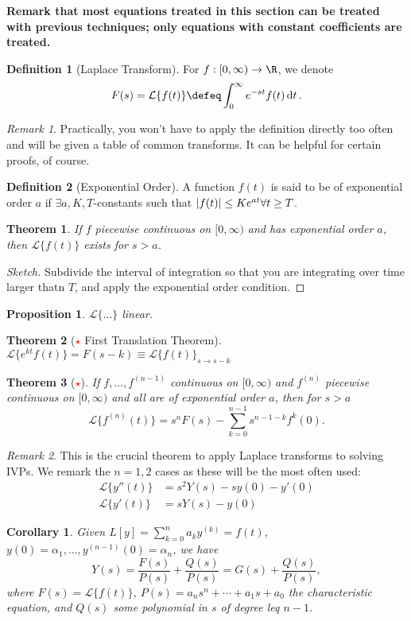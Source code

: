 \documentclass[12pt, oneside]{article}
\newcommand{\laplace}[1]{\mathcal{L}\{#1\}}
\theoremstyle{definition}
\newtheorem{defn}{Definition}
\theoremstyle{plain}
\newtheorem{thm}{Theorem}
\newtheorem{cor}{Corollary}
\newtheorem{prop}{Proposition}
\theoremstyle{remark}
\newtheorem{remark}{Remark}
\begin{document}
\textbf{Remark that most equations treated in this section can be treated with previous techniques; only equations with constant coefficients are treated.}

\begin{defn}[Laplace Transform]
  For $f : [0, \infty) \to \R$, we denote \[
  F(s) = \laplace{f(t)}   \defeq \int_{0}^\infty e^{-st} f(t) \dd{t}.
  \]
\end{defn}
\begin{remark}
  Practically, you won't have to apply the definition directly too often and will be given a table of common transforms. It can be helpful for certain proofs, of course.
\end{remark}
\begin{defn}[Exponential Order]
  A function $f(t)$ is said to be of exponential order $a$ if $\exists a, K, T$-constants such that $\abs{f(t)} \leq Ke^{at} \forall t \geq T$.
\end{defn}

\begin{thm}
If $f$ piecewise continuous on $[0, \infty)$ and has exponential order $a$, then $\laplace{f(t)}$ exists for $s > a$.
\end{thm}
\begin{proof}[Sketch]
Subdivide the interval of integration so that you are integrating over time larger thatn $T$, and apply the exponential order condition. 
\end{proof}

\begin{prop}
  $\laplace{\dots}$ linear.
\end{prop}

\begin{thm}[\textcolor{red}{$\star$} First Translation Theorem]
  $\laplace{e^{kt} f(t)} = F(s - k) \equiv \laplace{f(t)}_{s \to s- k}$
\end{thm}

\begin{thm}[\textcolor{red}{$\star$}]
  If $f, \dots, f^{(n-1)}$ continuous on $[0, \infty)$ and $f^{(n)}$ piecewise continuous on $[0, \infty)$ and all are of exponential order $a$, then for $s > a$ \[
  \laplace{f^{(n)}(t)} = s^{n} F(s) - \sum_{k=0}^{n-1} s^{n-1-k}f^{k}(0).
  \]
\end{thm}

\begin{remark}
This is the crucial theorem to apply Laplace transforms to solving IVPs. We remark the $n = 1, 2$ cases as these will be the most often used:
\begin{align*}
  \laplace{y''(t)} &= s^2 Y(s) - sy(0) - y'(0)\\
  \laplace{y'(t)} &= sY(s) - y(0)
\end{align*}
\end{remark}
\begin{cor}
  Given $L[y] = \sum_{k=0}^n a_k y^{(k)} = f(t)$, $y(0) = \alpha_1, \dots, y^{(n-1)}(0) = \alpha_n$, we have \[
  Y(s) = \frac{F(s)}{P(s)}  + \frac{Q(s)}{P(s)} = G(s) + \frac{Q(s)}{P(s)},
  \]
  where $F(s) = \laplace{f(t)}$, $P(s) = a_ns^n + \cdots + a_1 s + a_0$ the characteristic equation, and $Q(s)$ some polynomial in $s$ of degree leq $n - 1$.
\end{cor}
\end{document}
